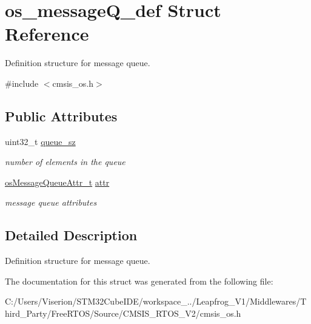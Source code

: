 \hypertarget{structos__message_q__def}{}\section{os\+\_\+message\+Q\+\_\+def Struct Reference}
\label{structos__message_q__def}


Definition structure for message queue.  




{\ttfamily \#include $<$cmsis\+\_\+os.\+h$>$}

\subsection*{Public Attributes}
\begin{DoxyCompactItemize}
\item 
\mbox{\label{structos__message_q__def_afc8e51d4d45e959fab77977baf8eb970}} 
uint32\+\_\+t \mbox{\hyperlink{structos__message_q__def_afc8e51d4d45e959fab77977baf8eb970}{queue\+\_\+sz}}
\begin{DoxyCompactList}\small\item\em number of elements in the queue \end{DoxyCompactList}\item 
\mbox{\label{structos__message_q__def_a59f226e679a91bab6728d2fcb127288f}} 
\mbox{\hyperlink{structos_message_queue_attr__t}{os\+Message\+Queue\+Attr\+\_\+t}} \mbox{\hyperlink{structos__message_q__def_a59f226e679a91bab6728d2fcb127288f}{attr}}
\begin{DoxyCompactList}\small\item\em message queue attributes \end{DoxyCompactList}\end{DoxyCompactItemize}


\subsection{Detailed Description}
Definition structure for message queue. 

The documentation for this struct was generated from the following file\+:\begin{DoxyCompactItemize}
\item 
C\+:/\+Users/\+Viserion/\+S\+T\+M32\+Cube\+I\+D\+E/workspace\+\_../\+Leapfrog\+\_\+\+V1/\+Middlewares/\+Third\+\_\+\+Party/\+Free\+R\+T\+O\+S/\+Source/\+C\+M\+S\+I\+S\+\_\+\+R\+T\+O\+S\+\_\+\+V2/cmsis\+\_\+os.\+h\end{DoxyCompactItemize}
